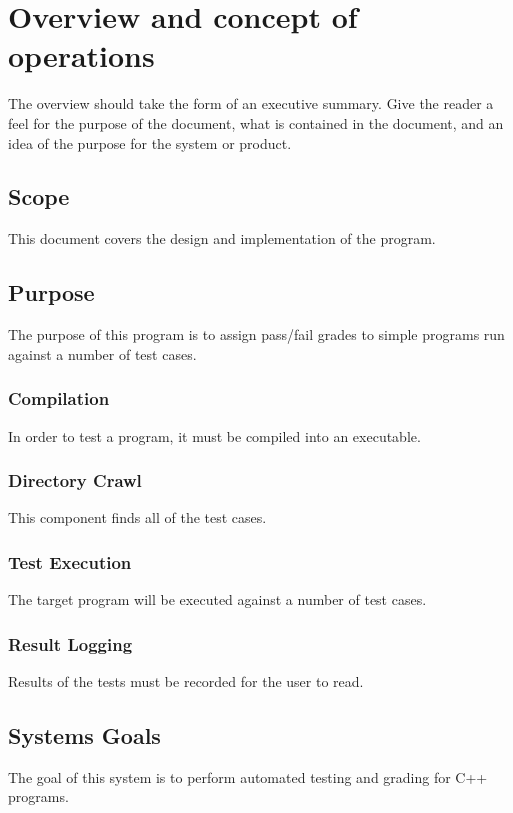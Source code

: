 
\chapter{Overview and concept of operations}

The overview should take the form of an executive summary. Give the reader a feel for the purpose of the document, what is contained in the document, and an idea of the purpose for the system or product.


\section{Scope}
This document covers the design and implementation of the program.

\section{Purpose}
The purpose of this program is to assign pass/fail grades to simple programs run against a number of test cases. 

\subsection{Compilation}
In order to test a program, it must be compiled into an executable.

\subsection{Directory Crawl}
This component finds all of the test cases. 

\subsection{Test Execution}
The target program will be executed against a number of test cases.

\subsection{Result Logging}
Results of the tests must be recorded for the user to read.

\section{Systems Goals}
The goal of this system is to perform automated testing and grading for C++ programs.

